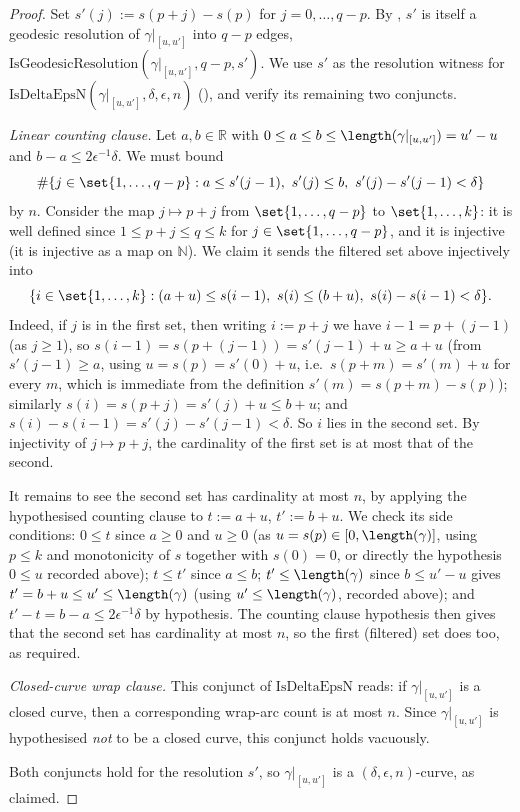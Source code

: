 \begin{proof}
  Set $s'(j) := s(p+j)-s(p)$ for $j = 0,\dots,q-p$. By , $s'$
  is itself a geodesic resolution of $\gamma|_{[u,u']}$ into $q-p$ edges,
  $\mathrm{IsGeodesicResolution}(\gamma|_{[u,u']},q-p,s')$. We use $s'$ as the resolution witness
  for $\mathrm{IsDeltaEpsN}(\gamma|_{[u,u']},\delta,\epsilon,n)$
  (), and verify its remaining two conjuncts.

  \emph{Linear counting clause.} Let $a,b \in \mathbb{R}$ with $0 \le a \le b \le
  \length(\gamma|_{[u,u']}) = u'-u$ and $b-a \le 2\epsilon^{-1}\delta$. We must bound
  \[
    \#\{ j \in \set{1,\dots,q-p} : a \le s'(j-1),\ s'(j) \le b,\ s'(j)-s'(j-1) < \delta \}
  \]
  by $n$. Consider the map $j \mapsto p+j$ from $\set{1,\dots,q-p}$ to $\set{1,\dots,k}$: it is
  well defined since $1 \le p+j \le q \le k$ for $j \in \set{1,\dots,q-p}$, and it is injective
  (it is injective as a map on $\mathbb{N}$). We claim it sends the filtered set above injectively
  into
  \[
    \{ i \in \set{1,\dots,k} : (a+u) \le s(i-1),\ s(i) \le (b+u),\ s(i)-s(i-1) < \delta \}
    .
  \]
  Indeed, if $j$ is in the first set, then writing $i := p+j$ we have $i-1 = p+(j-1)$ (as
  $j \ge 1$), so $s(i-1) = s(p+(j-1)) = s'(j-1)+u \ge a+u$ (from $s'(j-1) \ge a$, using
  $u=s(p)=s'(0)+u$, i.e.\ $s(p+m) = s'(m)+u$ for every $m$, which is immediate from the definition
  $s'(m) = s(p+m)-s(p)$); similarly $s(i) = s(p+j) = s'(j)+u \le b+u$; and $s(i)-s(i-1) =
  s'(j)-s'(j-1) < \delta$. So $i$ lies in the second set. By injectivity of $j \mapsto p+j$, the
  cardinality of the first set is at most that of the second.

  It remains to see the second set has cardinality at most $n$, by applying the hypothesised
  counting clause to $t := a+u$, $t' := b+u$. We check its side conditions: $0 \le t$ since $a \ge
  0$ and $u \ge 0$ (as $u = s(p) \in [0,\length(\gamma)]$, using $p \le k$ and monotonicity of $s$
  together with $s(0)=0$, or directly the hypothesis $0 \le u$ recorded above); $t \le t'$ since
  $a \le b$; $t' \le \length(\gamma)$ since $b \le u'-u$ gives $t' = b+u \le u' \le \length(\gamma)$
  (using $u' \le \length(\gamma)$, recorded above); and $t'-t = b-a \le 2\epsilon^{-1}\delta$ by
  hypothesis. The counting clause hypothesis then gives that the second set has cardinality at
  most $n$, so the first (filtered) set does too, as required.

  \emph{Closed-curve wrap clause.} This conjunct of $\mathrm{IsDeltaEpsN}$ reads: if
  $\gamma|_{[u,u']}$ is a closed curve, then a corresponding wrap-arc count is at most $n$. Since
  $\gamma|_{[u,u']}$ is hypothesised \emph{not} to be a closed curve, this conjunct holds
  vacuously.

  Both conjuncts hold for the resolution $s'$, so $\gamma|_{[u,u']}$ is a $(\delta,\epsilon,n)$-curve,
  as claimed.
\end{proof}
